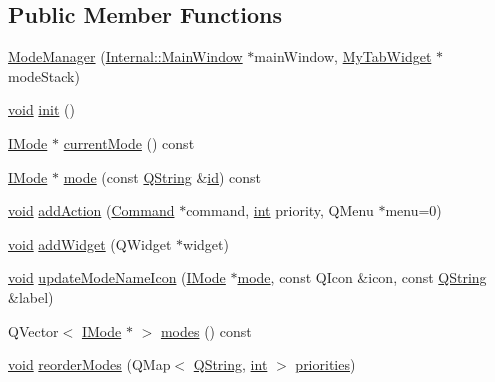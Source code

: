 \subsection*{Public Member Functions}
\begin{DoxyCompactItemize}
\item 
\hyperlink{group___core_plugin_ga7424a5232a9062d5d715d46cb6dab058}{Mode\-Manager} (\hyperlink{class_core_1_1_internal_1_1_main_window}{Internal\-::\-Main\-Window} $\ast$main\-Window, \hyperlink{class_my_tab_widget}{My\-Tab\-Widget} $\ast$mode\-Stack)
\item 
\hyperlink{group___u_a_v_objects_plugin_ga444cf2ff3f0ecbe028adce838d373f5c}{void} \hyperlink{group___core_plugin_ga0602e86f2b78e9b234c3fa737837d266}{init} ()
\item 
\hyperlink{class_core_1_1_i_mode}{I\-Mode} $\ast$ \hyperlink{group___core_plugin_ga8b622df4a78ae2e368474999c0698306}{current\-Mode} () const 
\item 
\hyperlink{class_core_1_1_i_mode}{I\-Mode} $\ast$ \hyperlink{group___core_plugin_ga2f29188b707a73ac13c2312497b99219}{mode} (const \hyperlink{group___u_a_v_objects_plugin_gab9d252f49c333c94a72f97ce3105a32d}{Q\-String} \&\hyperlink{glext_8h_a58c2a664503e14ffb8f21012aabff3e9}{id}) const 
\item 
\hyperlink{group___u_a_v_objects_plugin_ga444cf2ff3f0ecbe028adce838d373f5c}{void} \hyperlink{group___core_plugin_ga59c08a546248c7443d069fffc04a6b90}{add\-Action} (\hyperlink{class_core_1_1_command}{Command} $\ast$command, \hyperlink{ioapi_8h_a787fa3cf048117ba7123753c1e74fcd6}{int} priority, Q\-Menu $\ast$menu=0)
\item 
\hyperlink{group___u_a_v_objects_plugin_ga444cf2ff3f0ecbe028adce838d373f5c}{void} \hyperlink{group___core_plugin_ga44a336b5464c757765a238ac56da3cc3}{add\-Widget} (Q\-Widget $\ast$widget)
\item 
\hyperlink{group___u_a_v_objects_plugin_ga444cf2ff3f0ecbe028adce838d373f5c}{void} \hyperlink{group___core_plugin_ga19ea1eb5b0bc5b064afc7d4498a23b86}{update\-Mode\-Name\-Icon} (\hyperlink{class_core_1_1_i_mode}{I\-Mode} $\ast$\hyperlink{glext_8h_a1e71d9c196e4683cc06c4b54d53f7ef5}{mode}, const Q\-Icon \&icon, const \hyperlink{group___u_a_v_objects_plugin_gab9d252f49c333c94a72f97ce3105a32d}{Q\-String} \&label)
\item 
Q\-Vector$<$ \hyperlink{class_core_1_1_i_mode}{I\-Mode} $\ast$ $>$ \hyperlink{group___core_plugin_gafe066d728cdaeffc19eb6407a41e29e0}{modes} () const 
\item 
\hyperlink{group___u_a_v_objects_plugin_ga444cf2ff3f0ecbe028adce838d373f5c}{void} \hyperlink{group___core_plugin_ga5d0135f443bbd69ffdc3cf24152cf9a0}{reorder\-Modes} (Q\-Map$<$ \hyperlink{group___u_a_v_objects_plugin_gab9d252f49c333c94a72f97ce3105a32d}{Q\-String}, \hyperlink{ioapi_8h_a787fa3cf048117ba7123753c1e74fcd6}{int} $>$ \hyperlink{glext_8h_ab2d88f127452baef8666791f74e9a794}{priorities})
\end{DoxyCompactItemize}
